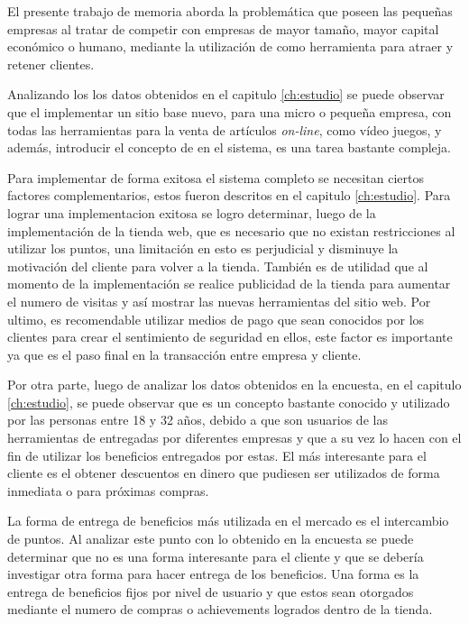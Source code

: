 El presente trabajo de memoria aborda la problemática que poseen las pequeñas
empresas al tratar de competir con empresas de mayor tamaño, mayor capital
económico o humano, mediante la utilización de {\GAM} como herramienta para atraer
y retener clientes.

Analizando los los datos obtenidos en el capitulo \ref{ch:estudio} se puede observar que el
implementar un sitio base nuevo, para una micro o pequeña empresa, con todas las
herramientas para la venta de artículos \emph{on-line}, como vídeo juegos, y además,
introducir el concepto de {\GAM} en el sistema, es una tarea bastante compleja.

Para implementar de forma exitosa el sistema completo se necesitan ciertos factores
complementarios, estos fueron descritos en el capitulo \ref{ch:estudio}. Para lograr
una implementacion exitosa se logro determinar, luego de la implementación de la tienda web, 
que es necesario que no existan restricciones al utilizar los puntos, una limitación
en esto es perjudicial y disminuye la motivación del cliente para volver a la tienda. 
También es de utilidad que al momento de la implementación se realice publicidad
de la tienda para aumentar el numero de visitas y así mostrar las nuevas herramientas
del sitio web. Por ultimo, es recomendable utilizar medios de pago que sean conocidos
por los clientes para crear el sentimiento de seguridad en ellos, este factor es importante
ya que es el paso final en la transacción entre empresa y cliente. 

Por otra parte, luego de analizar los datos obtenidos en la encuesta, en el capitulo \ref{ch:estudio},
 se puede observar que {\GAM} es un concepto bastante conocido y utilizado por las personas 
entre 18 y 32 años, debido a que son usuarios de las herramientas de {\GAM} entregadas por
diferentes empresas y que a su vez lo hacen con el fin de utilizar los beneficios entregados 
por estas. El más interesante para el cliente es el obtener descuentos en dinero
que pudiesen ser utilizados de forma inmediata o para próximas compras.

La forma de entrega de beneficios más utilizada en el mercado es el intercambio de puntos. 
Al analizar este punto con lo obtenido en la encuesta se puede determinar que no es 
una forma interesante para el cliente y que se debería investigar otra forma para 
hacer entrega de los beneficios. Una forma es la entrega de beneficios fijos por nivel 
de usuario y que estos sean otorgados mediante el numero de compras o achievements logrados
dentro de la tienda.

